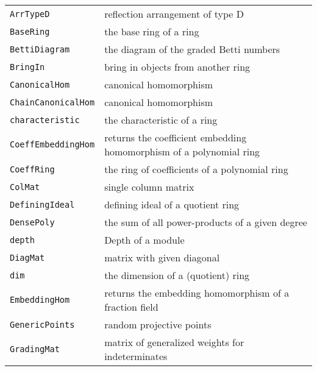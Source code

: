 \documentclass[a4paper]{mybook}
\begin{document}
\begin{center}
\begin{longtable}{ll}
{\verb~ArrTypeD~} &
      reflection arrangement of type D\\
   
{\verb~BaseRing~} &
      the base ring of a ring\\
   
{\verb~BettiDiagram~} &
      the diagram of the graded Betti numbers\\
   
{\verb~BringIn~} &
      bring in objects from another ring\\
   
{\verb~CanonicalHom~} &
      canonical homomorphism\\
   
{\verb~ChainCanonicalHom~} &
      canonical homomorphism\\
   
{\verb~characteristic~} &
      the characteristic of a ring\\
   
{\verb~CoeffEmbeddingHom~} &
      returns the coefficient embedding homomorphism of a polynomial ring\\
   
{\verb~CoeffRing~} &
      the ring of coefficients of a polynomial ring\\
   
{\verb~ColMat~} &
      single column matrix\\
   
{\verb~DefiningIdeal~} &
      defining ideal of a quotient ring\\
   
{\verb~DensePoly~} &
      the sum of all power-products of a given degree\\
   
{\verb~depth~} &
      Depth of a module\\
   
{\verb~DiagMat~} &
      matrix with given diagonal\\
   
{\verb~dim~} &
      the dimension of a (quotient) ring\\
   
{\verb~EmbeddingHom~} &
      returns the embedding homomorphism of a fraction field\\
   
{\verb~GenericPoints~} &
      random projective points\\
   
{\verb~GradingMat~} &
      matrix of generalized weights for indeterminates\\
   

\end{longtable}
\end{center}
\end{document}
